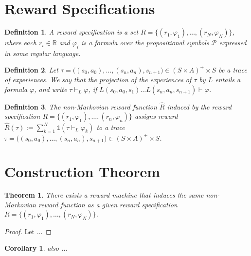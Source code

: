 \documentclass[12pt, a4paper]{article}
\theoremstyle{plain}
\newtheorem*{theorem}{Theorem}
\newtheorem*{corollary}{Corollary}
\newtheorem*{definition}{Definition}
\renewcommand{\phi}{\varphi}
\begin{document}
\section*{Reward Specifications}

\begin{definition}
	A \emph{reward specification} is a set $R = \{(r_1, \phi_1), \dots, (r_N, \phi_N)\}$, where each $r_i \in \mathbb{R}$ and $\phi_i$ is a formula over the propositional symbols $\mathcal{P}$ expressed in some regular language.
\end{definition}

\begin{definition}
	Let $\tau = \big( (s_0, a_0), \dots, (s_n, a_n), s_{n+1} \big)\in (S \times A)^+ \times S$ be a trace of experiences. We say that the projection of the experiences of $\tau$ by $L$ \emph{entails} a formula $\phi$, and write $\tau \vdash_L \phi$, if $L(s_0, a_0, s_1) \dots L(s_n, a_n, s_{n+1}) \vdash \phi$.
\end{definition}

\begin{definition}
	The non-Markovian reward function $\hat{R}$ \emph{induced by the reward specification} $R = \{(r_1, \phi_1), \dots, (r_n, \phi_n)\}$ assigns reward $\hat{R}(\tau) := \sum_{k=1}^N \mathds{1}(\tau \vdash_L \phi_k)$ to a trace $\tau = \big( (s_0, a_0), \dots, (s_n, a_n), s_{n+1} \big) \in (S \times A)^+ \times S$.
\end{definition}

\section*{Construction Theorem}

\begin{theorem}
	There exists a reward machine that induces the same non-Markovian reward function as a given reward specification $R = \{(r_1, \phi_1), \dots, (r_N, \phi_N)\}$.
\end{theorem}

\begin{proof}
	Let ...
\end{proof}

\begin{corollary}
	also ...
\end{corollary}

\end{document}
